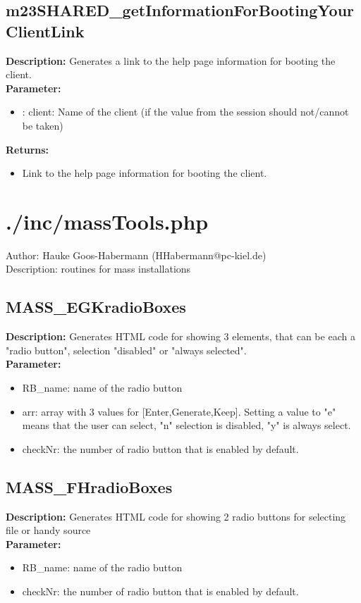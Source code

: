 \subsection{m23SHARED\_getInformationForBootingYourClientLink}
\textbf{Description:} Generates a link to the help page information for booting the client.\\
\textbf{Parameter:}
\begin{itemize}
\item : client: Name of the client (if the value from the session should not/cannot be taken)
\end{itemize}
\textbf{Returns:}
\begin{itemize}
\item Link to the help page information for booting the client.
\end{itemize}

\newpage\section{./inc/massTools.php}
 Author: Hauke Goos-Habermann (HHabermann@pc-kiel.de)\\
 Description: routines for mass installations\\

\subsection{MASS\_EGKradioBoxes}
\textbf{Description:} Generates HTML code for showing 3 elements, that can be each a "radio button", selection "disabled" or "always selected".\\
\textbf{Parameter:}
\begin{itemize}
\item RB\_name: name of the radio button
\item arr: array with 3 values for [Enter,Generate,Keep]. Setting a value to "e" means that the user can select, "n" selection is disabled, "y" is always select.
\item checkNr: the number of radio button that is enabled by default.
\end{itemize}

\subsection{MASS\_FHradioBoxes}
\textbf{Description:} Generates HTML code for showing 2 radio buttons for selecting file or handy source \\
\textbf{Parameter:}
\begin{itemize}
\item RB\_name: name of the radio button
\item checkNr: the number of radio button that is enabled by default.
\end{itemize}

